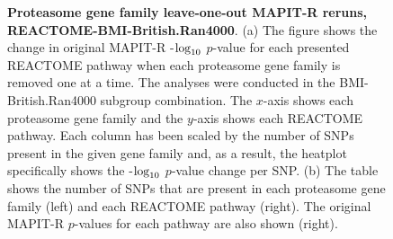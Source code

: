 \documentclass[10pt,a4paper]{article}
\def\log{{\rm log}}
\begin{document}
\begin{figure}[ht]
\centering
\vspace*{-.5cm}
\par
{}
\caption[TBD]{\textbf{Proteasome gene family leave-one-out MAPIT-R reruns, REACTOME-BMI-British.Ran4000}. (a) The figure shows the change in original MAPIT-R -$\log_{10}$ $p$-value for each presented REACTOME pathway when each proteasome gene family is removed one at a time. The analyses were conducted in the BMI-British.Ran4000 subgroup combination. The $x$-axis shows each proteasome gene family and the $y$-axis shows each REACTOME pathway. Each column has been scaled by the number of SNPs present in the given gene family and, as a result, the heatplot specifically shows the -$\log_{10}$ $p$-value change per SNP. (b) The table shows the number of SNPs that are present in each proteasome gene family (left) and each REACTOME pathway (right). The original MAPIT-R $p$-values for each pathway are also shown (right).}

\end{figure}
\end{document}
